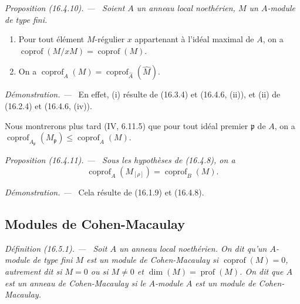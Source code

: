 \documentclass[10pt,oneside]{book}
\makeatletter
\newcommand{\setmanualcurrentlabel}[1]{\def\@currentlabel{#1}}
\newcommand{\oldpage}[2][]{%
  \setcounter{footnote}{0}%
  \marginpar{\scriptsize\textbf{#1}~|~#2}\ignorespaces}
\newenvironment{definition}[1][]{%
  \setmanualcurrentlabel{#1}\par\medskip\noindent\itshape Définition (#1). ---\ }{\par}
\newenvironment{proposition}[1][]{%
  \setmanualcurrentlabel{#1}\par\medskip\noindent\itshape Proposition (#1). ---\ }{\par}
\newenvironment{proof}{%
  \par\medskip\noindent\textit{Démonstration. ---\ }}{\par}
\makeatother
\begin{document}
\begin{proposition}[16.4.10]
\label{0.16.4.10-fr}
Soient $A$ un anneau local noethérien, $M$ un $A$-module de type fini.
\oldpage[0\textsubscript{IV-1}]{36}
\begin{enumerate}
  \item[(i)] Pour tout élément $M$-régulier $x$ appartenant à l'idéal maximal
  de $A$, on a
  $\operatorname{coprof}(M/xM)=\operatorname{coprof}(M)$.
  \item[(ii)] On a
  $\operatorname{coprof}_A(M)=\operatorname{coprof}_{\widehat A}(\widehat M)$.
\end{enumerate}
\end{proposition}

\begin{proof}
En effet, (i) résulte de (16.3.4) et (16.4.6, (ii)), et (ii) de (16.2.4) et
(16.4.6, (iv)).
\end{proof}

Nous montrerons plus tard (IV, 6.11.5) que pour tout idéal premier
$\mathfrak{p}$ de $A$, on a
$\operatorname{coprof}_{A_{\mathfrak{p}}}(M_{\mathfrak{p}})
\leq\operatorname{coprof}_A(M)$.

\begin{proposition}[16.4.11]
\label{0.16.4.11-fr}
Sous les hypothèses de (16.4.8), on a
\begin{equation}
\label{0.16.4.11.1-fr}
\tag{16.4.11.1}
  \operatorname{coprof}_A(M_{[\rho]})=\operatorname{coprof}_B(M).
\end{equation}
\end{proposition}

\begin{proof}
Cela résulte de (16.1.9) et (16.4.8).
\end{proof}

\subsection{Modules de Cohen-Macaulay}
\label{subsection:0.16.5-fr}

\begin{definition}[16.5.1]
\label{0.16.5.1-fr}
Soit $A$ un anneau local noethérien. On dit qu'un $A$-module de type fini $M$
est un \emph{module de Cohen-Macaulay} si
$\operatorname{coprof}(M)=0$, autrement dit si $M=0$ ou si $M\neq0$ et
$\dim(M)=\operatorname{prof}(M)$. On dit que $A$ est un
\emph{anneau de Cohen-Macaulay} si le $A$-module $A$ est un module de
Cohen-Macaulay.
\end{definition}
\end{document}
